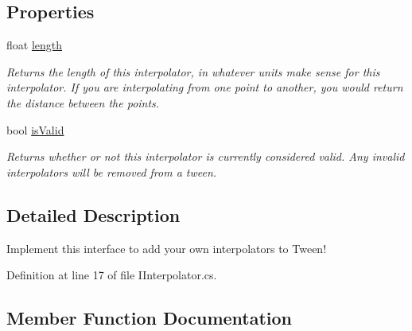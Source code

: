 \subsection*{Properties}
\begin{DoxyCompactItemize}
\item 
float \mbox{\hyperlink{interface_leap_1_1_unity_1_1_animation_1_1_i_interpolator_ab028a4992f1315ce541913032f902282}{length}}
\begin{DoxyCompactList}\small\item\em Returns the \textquotesingle{}length\textquotesingle{} of this interpolator, in whatever units make sense for this interpolator. If you are interpolating from one point to another, you would return the distance between the points. \end{DoxyCompactList}\item 
bool \mbox{\hyperlink{interface_leap_1_1_unity_1_1_animation_1_1_i_interpolator_a0cf0a3c8d78b1baa20dc9702b0a5d264}{is\+Valid}}
\begin{DoxyCompactList}\small\item\em Returns whether or not this interpolator is currently considered valid. Any invalid interpolators will be removed from a tween. \end{DoxyCompactList}\end{DoxyCompactItemize}


\subsection{Detailed Description}
Implement this interface to add your own interpolators to Tween! 



Definition at line 17 of file I\+Interpolator.\+cs.



\subsection{Member Function Documentation}
\mbox{\label{interface_leap_1_1_unity_1_1_animation_1_1_i_interpolator_a4ddd3ea9f35d3f2568921ad2f1112869}} 
